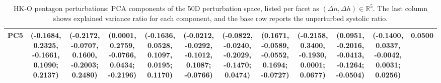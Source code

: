\begin{table}[p]
\begin{tabular}{lccccccccccc}
 PC5 & (-0.1684, 0.2325, -0.1661, 0.1090; 0.2137) & (-0.2172, -0.0707, 0.1600, -0.2003; 0.2480) & (0.0001, 0.2759, -0.0766, 0.0434; -0.2196) & (-0.1636, 0.0528, 0.1097, 0.0195; 0.1170) & (-0.0212, -0.0292, -0.1012, 0.1087; -0.0766) & (-0.0822, -0.0240, -0.2029, -0.1470; 0.0474) & (0.1671, -0.0589, -0.0552, 0.1694; -0.0727) & (-0.2158, 0.3400, -0.1930, 0.0001; 0.0677) & (0.0951, -0.2016, -0.0413, -0.1264; -0.0504) & (-0.1400, 0.0337, -0.0042, 0.0031; 0.0256) & 0.0500 \\
\bottomrule
\end{tabular}
\caption{HK-O pentagon perturbations: PCA components of the 50D perturbation space, listed per facet as $(\Delta n, \Delta h) \in \mathbb{R}^5$. The last column shows explained variance ratio for each component, and the base row reports the unperturbed systolic ratio.}
\label{tab:pentagon-perturb-pca}
\end{table}
